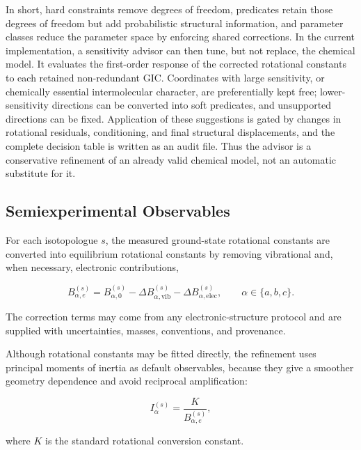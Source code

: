 \documentclass[aip,jcp,reprint,longbibliography,floatfix]{revtex4-2}
\begin{document}
In short, hard constraints remove degrees of freedom, predicates retain those
degrees of freedom but add probabilistic structural information, and parameter
classes reduce the parameter space by enforcing shared corrections. In the
current implementation, a sensitivity advisor can then tune, but not replace,
the chemical model. It evaluates the first-order response of the corrected
rotational constants to each retained non-redundant GIC. Coordinates with large
sensitivity, or chemically essential intermolecular character, are
preferentially kept free; lower-sensitivity directions can be converted into
soft predicates, and unsupported directions can be fixed. Application of these
suggestions is gated by changes in rotational residuals, conditioning, and
final structural displacements, and the complete decision table is written as
an audit file. Thus the advisor is a conservative refinement of an already
valid chemical model, not an automatic substitute for it.


\subsection{Semiexperimental Observables}

For each isotopologue $s$, the measured ground-state rotational constants are
converted into equilibrium rotational constants by removing vibrational and,
when necessary, electronic contributions,\cite{Costain1958,Pawlowski2002,Piccardo2015B3LYP,Penocchio2015B2PLYP}

\begin{equation}
B_{\alpha,e}^{(s)}
= B_{\alpha,0}^{(s)}
- \Delta B_{\alpha,\mathrm{vib}}^{(s)}
- \Delta B_{\alpha,\mathrm{elec}}^{(s)},
\qquad
\alpha \in \{a,b,c\}.
\end{equation}

The correction terms may come from any electronic-structure
protocol and are supplied with uncertainties, masses, conventions, and
provenance.\cite{Mendolicchio2025FastDvib}

Although rotational constants may be fitted directly, the refinement uses
principal moments of inertia as default observables, because they give a smoother
geometry dependence and avoid reciprocal amplification:

\begin{equation}
I_{\alpha}^{(s)}
=
\frac{K}
{B_{\alpha,e}^{(s)}},
\end{equation}

where $K$ is the standard rotational conversion constant.
\end{document}
